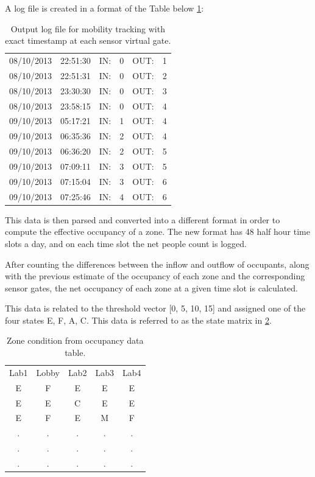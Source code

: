 A log file is created in a format of the Table below \ref{table:logfile}:
 \begin{center}
\begin{table}[!ht]
  \centering
  \begin{tabular}{*6c}
08/10/2013& 22:51:30& IN:& 0 &OUT:& 1\\
08/10/2013& 22:51:31 &IN: &0 &OUT:& 2\\
08/10/2013 &23:30:30& IN: &0& OUT: &3\\
08/10/2013& 23:58:15 &IN:& 0 &OUT:& 4\\
09/10/2013 &05:17:21& IN: &1 &OUT:& 4\\
09/10/2013 &06:35:36 &IN:& 2& OUT:& 4\\
09/10/2013 &06:36:20& IN:& 2& OUT:& 5\\
09/10/2013 &07:09:11& IN: &3& OUT:& 5\\
09/10/2013 &07:15:04 &IN:& 3& OUT:& 6\\
09/10/2013 &07:25:46& IN:& 4& OUT: &6\\
\end{tabular}
\caption{Output log file for mobility tracking with exact timestamp at each sensor virtual gate.}
\label{table:logfile}
\end{table}
 \end{center}

This data is then parsed and converted into a different format in order to compute the effective occupancy of a zone.  The new format has 48 half hour time slots a day, and on each time slot the net people count is logged.

After counting the differences between the inflow and outflow of occupants, along with the previous estimate of the occupancy of each zone and the corresponding sensor gates, the net occupancy of each zone at a given time slot is calculated.

This data is related to the threshold vector [0, 5, 10, 15] and assigned one of the four states {E, F,  A, C}.   This data is referred to as the state matrix in \ref{table:stateslog}.
\begin{table}
  \centering

   \begin{tabular}{*5c}
Lab1&Lobby&Lab2&Lab3&Lab4\\
E&F&E&E&E\\
E&E&C&E&E\\
E&F&E&M&F\\
. &. &. &. &. \\
. &. &. &. &. \\
. &. &. &. &. \\
\end{tabular} \caption{Zone condition from occupancy data table.} \label{table:stateslog}
\end{table}

